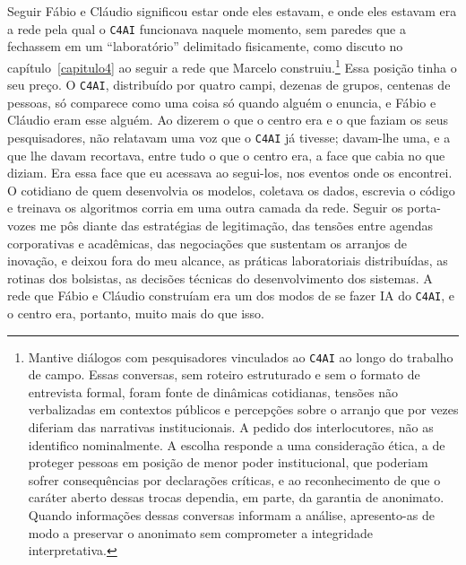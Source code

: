 Seguir Fábio e Cláudio significou estar onde eles estavam, e onde eles estavam era a rede pela qual o \texttt{C4AI} funcionava naquele momento, sem paredes que a fechassem em um \enquote{laboratório} delimitado fisicamente, como discuto no capítulo~\ref{capitulo4} ao seguir a rede que Marcelo construiu.\footnote{Mantive diálogos com pesquisadores vinculados ao \texttt{C4AI} ao longo do trabalho de campo. Essas conversas, sem roteiro estruturado e sem o formato de entrevista formal, foram fonte de dinâmicas cotidianas, tensões não verbalizadas em contextos públicos e percepções sobre o arranjo que por vezes diferiam das narrativas institucionais. A pedido dos interlocutores, não as identifico nominalmente. A escolha responde a uma consideração ética, a de proteger pessoas em posição de menor poder institucional, que poderiam sofrer consequências por declarações críticas, e ao reconhecimento de que o caráter aberto dessas trocas dependia, em parte, da garantia de anonimato. Quando informações dessas conversas informam a análise, apresento-as de modo a preservar o anonimato sem comprometer a integridade interpretativa.} Essa posição tinha o seu preço. O \texttt{C4AI}, distribuído por quatro campi, dezenas de grupos, centenas de pessoas, só comparece como uma coisa só quando alguém o enuncia, e Fábio e Cláudio eram esse alguém. Ao dizerem o que o centro era e o que faziam os seus pesquisadores, não relatavam uma voz que o \texttt{C4AI} já tivesse; davam-lhe uma, e a que lhe davam recortava, entre tudo o que o centro era, a face que cabia no que diziam. Era essa face que eu acessava ao segui-los, nos eventos onde os encontrei. O cotidiano de quem desenvolvia os modelos, coletava os dados, escrevia o código e treinava os algoritmos corria em uma outra camada da rede. Seguir os porta-vozes me pôs diante das estratégias de legitimação, das tensões entre agendas corporativas e acadêmicas, das negociações que sustentam os arranjos de inovação, e deixou fora do meu alcance, as práticas laboratoriais distribuídas, as rotinas dos bolsistas, as decisões técnicas do desenvolvimento dos sistemas. A rede que Fábio e Cláudio construíam era um dos modos de se fazer IA do \texttt{C4AI}, e o centro era, portanto, muito mais do que isso. 

